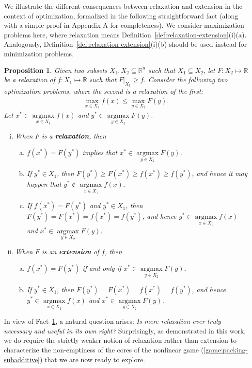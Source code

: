 \documentclass[11pt]{article}\usepackage[]{graphicx}\usepackage[]{xcolor}
\newtheorem{prop}{Proposition}
\DeclareMathOperator*{\argmax}{argmax}
\begin{document}
We illustrate the different consequences between relaxation and extension in the context of optimization, formalized in the following straightforward fact (along with a simple proof in Appendix A for completeness). 
We consider maximization problems here, where relaxation means Definition~\ref{def:relaxation-extension}(i)(a). Analogously, Definition~\ref{def:relaxation-extension}(i)(b) should be used instead for minimization problems.
\begin{prop}\label{prop:relax-exten}
Given two subsets $X_1, X_2\subseteq \mathbb{R}^n$ such that $X_1\subseteq X_2$, let $F:X_2\mapsto \mathbb{R}$ be a relaxation of $f:X_1\mapsto \mathbb{R}$ such that $F|_{X_1}\ge f$. Consider the following two optimization problems, where the second is a relaxation of the first:
\begin{eqnarray*}
\max\limits_{x\in X_1} f(x)\le \max\limits_{y\in X_2} F(y).
\end{eqnarray*}
Let $x^*\in \argmax\limits_{x\in X_1} f(x)$ and $y^*\in\argmax\limits_{y\in X_2} F(y)$. 
\begin{enumerate}[(i)]
\item When $F$ is a \textbf{relaxation}, then 
\begin{enumerate}[(a)]
\item $f(x^*)=F(y^*)$ implies that $x^*\in\argmax\limits_{y\in X_2} F(y)$.
\item If $y^* \in X_1$, then  $F(y^*)\ge F(x^*)\ge f(x^*)\ge f(y^*)$, and hence it may happen that $y^*\notin \argmax\limits_{x\in X_1} f(x)$.
\item If $f(x^*)=F(y^*)$ and $y^* \in X_1$, then $F(y^*)=F(x^*)=f(x^*)=f(y^*)$, and hence $y^* \in\argmax\limits_{x\in X_1} f(x)$ and $x^*\in\argmax\limits_{y\in X_2} F(y)$.
\end{enumerate}
\item When $F$ is an \textbf{extension} of $f$, then 
\begin{enumerate}[(a)]
\item $f(x^*)=F(y^*)$ if and only if $x^*\in\argmax\limits_{y\in X_2} F(y)$.
\item If $y^* \in X_1$, then $F(y^*)=F(x^*)=f(x^*)=f(y^*)$, and hence $y^* \in\argmax\limits_{x\in X_1} f(x)$ and $x^*\in\argmax\limits_{y\in X_2} F(y)$.
\end{enumerate}
\end{enumerate}
\end{prop}



In view of Fact~\ref{prop:relax-exten}, a natural question arises: \emph{Is mere relaxation ever truly necessary and useful in its own right?} Surprisingly, as demonstrated in this work, we do require the strictly weaker notion of relaxation rather than extension to characterize the non-emptiness of the cores of the nonlinear game (\ref{game:packing-subadditive}) that we are now ready to explore. 
\end{document}
